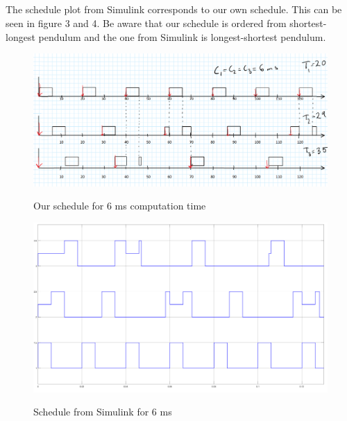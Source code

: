 \documentclass[12pt,a4paper]{article}
\begin{document}
   

\subsection{}%

The schedule plot from Simulink corresponds to our own schedule. This can be seen in figure 3 and 4. Be aware that our schedule is ordered from shortest-longest pendulum and the one from Simulink is longest-shortest pendulum.
    \begin{center}
      \begin{figure}[H]
      \centering
        \includegraphics[scale=0.3]{ex41.png}
        \label{fig:ex41}
        \caption{Our schedule for 6 ms computation time}
     \end{figure}
    \end{center}
    
    \begin{center}
     \begin{figure}[H]
      \centering
        \includegraphics[scale=0.2]{ex42.png}
        \label{fig:ex32}
      \caption{Schedule from Simulink for 6 ms}
      \end{figure}
    \end{center}
\end{document}
